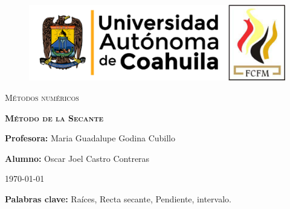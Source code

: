 \documentclass[12pt]{article}
\begin{document}
		
		\begin{titlepage}
		
			\centering
			{\bfseries
			\begin{figure}[h!]
				\centering
				\includegraphics[width=\linewidth]{Nom_UAdeC_FCFM.png} 				
			\end{figure}
			\par}
			\vspace{2cm}
			{\scshape\LARGE Métodos numéricos \par}
			\vspace{3cm}
			{\scshape\Huge \textbf{Método de la Secante} \par}
			\vfill
			{\LARGE \textbf{Profesora:} Maria Guadalupe Godina Cubillo \par}
			\vspace{3cm}
			{\LARGE \textbf{Alumno:} Oscar Joel Castro Contreras \par}
			\vfill
			{\Large \today \par}
			\thispagestyle{empty}
			
		\end{titlepage}
	
		\newpage

		\begin{abstract}
			\noindent En este reporte explico un poco de los métodos que existen para encontrar las raíces de cualquier 
			polinomio o función que tenga raíces, y en específico explico, qué es, en que consiste y cuales son las 
			limitaciones del método de la Secante para encontrar raíces.
		\end{abstract}

		\textbf{Palabras clave:} Raíces, Recta secante, Pendiente, intervalo.
\end{document}
